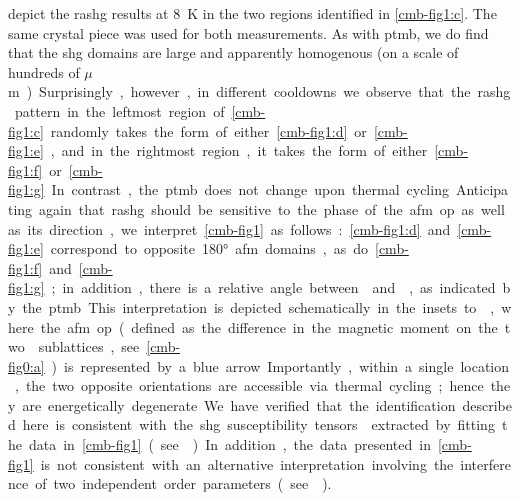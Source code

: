  depict the \gls{rashg} results at \qty{8}{K} in the two regions identified in \cref{cmb-fig1:c}.
The same crystal piece was used for both measurements.
As with \gls{ptmb}, we do find that the \gls{shg} domains are large and apparently homogenous (on a scale of hundreds of \si{$\mu$ m}).
Surprisingly, however, in different cooldowns we observe that the \gls{rashg} pattern in the leftmost region of \cref{cmb-fig1:c} randomly takes the form of either \cref{cmb-fig1:d} or \cref{cmb-fig1:e}, and in the rightmost region, it takes the form of either \cref{cmb-fig1:f} or \cref{cmb-fig1:g}.
In contrast, the \gls{ptmb} does not change upon thermal cycling.
Anticipating again that \gls{rashg} should be sensitive to the phase of the \gls{afm} \gls{op} as well as its direction, we interpret \cref{cmb-fig1} as follows: \cref{cmb-fig1:d} and \cref{cmb-fig1:e} correspond to opposite \ang{180} \gls{afm} domains, as do \cref{cmb-fig1:f} and \cref{cmb-fig1:g}; in addition, there is a relative angle between  and , as indicated by the \gls{ptmb}.
This interpretation is depicted schematically in the insets to , where the \gls{afm} \gls{op} (defined as the difference in the magnetic moment on the two  sublattices, see \cref{cmb-fig0:a}) is represented by a blue arrow.
Importantly, within a single location, the two opposite orientations are accessible via thermal cycling; hence they are energetically degenerate.
We have verified that the identification described here is consistent with the \gls{shg} susceptibility tensors\citep{boyd} extracted by fitting the data in \cref{cmb-fig1} (see ).
In addition, the data presented in \cref{cmb-fig1} is not consistent with an alternative interpretation involving the interference of two independent order parameters (see ).

